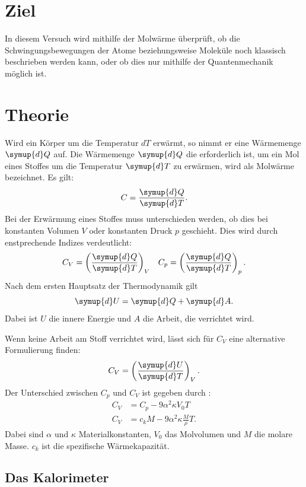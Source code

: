 
\section{Ziel}
In diesem Versuch wird mithilfe der Molwärme überprüft, ob die Schwingungsbewegungen der Atome beziehungsweise Moleküle
noch klassisch beschrieben werden kann, oder ob dies nur mithilfe der Quantenmechanik möglich ist.

\section{Theorie}
Wird ein Körper um die Temperatur $dT$ erwärmt, so nimmt er eine Wärmemenge $\symup{d}Q$ auf.
Die Wärmemenge $\symup{d}Q$ die erforderlich ist, um ein Mol eines Stoffes um die Temperatur $\symup{d}T$ zu erwärmen, wird als
Molwärme bezeichnet. Es gilt:
\begin{equation}
  C=\frac{\symup{d}Q}{\symup{d}T} .
\end{equation}
Bei der Erwärmung eines Stoffes muss unterschieden werden, ob dies bei konstanten Volumen $V$ oder konstanten Druck $p$
geschieht. Dies wird durch enstprechende Indizes verdeutlicht:
\begin{align}
  C_V=\left(\frac{\symup{d}Q}{\symup{d}T}\right)_V && C_p=\left(\frac{\symup{d}Q}{\symup{d}T}\right)_p .
\end{align}
Nach dem ersten Hauptsatz der Thermodynamik gilt
\begin{equation}
  \symup{d}U=\symup{d}Q+\symup{d}A .
\end{equation}
Dabei ist $U$ die innere Energie und $A$ die Arbeit, die verrichtet wird.

Wenn keine Arbeit am Stoff verrichtet wird, lässt sich für $C_V$ eine alternative Formulierung finden:
\begin{equation}
  C_V=\left(\frac{\symup{d}U}{\symup{d}T}\right)_V .
\end{equation}
Der Unterschied zwischen $C_p$ und $C_V$ ist gegeben durch :
\begin{align}
  C_V &= C_p - 9 \alpha^2 \kappa V_0 T \\
  C_V &= c_k M - 9 \alpha^2 \kappa \frac{M}{\rho} T .
  \label{eqn:molw}
\end{align}
Dabei sind $\alpha$ und $\kappa$ Materialkonstanten, $V_0$ das Molvolumen und $M$ die molare Masse.
$c_k$ ist die spezifische Wärmekapazität.

\subsection{Das Kalorimeter}

